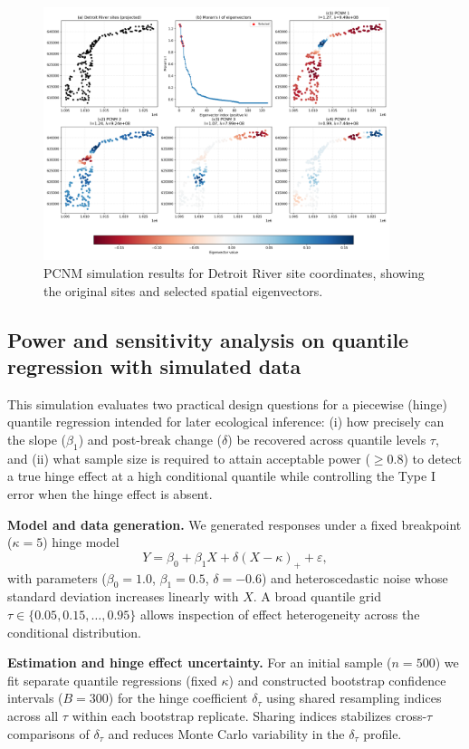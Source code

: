 \begin{figure}[!h]
\centering
\includegraphics[width=0.9\textwidth]{../results/preliminary_results/pcnm_simulation_detroit_river.png}
\caption{PCNM simulation results for Detroit River site coordinates, showing the original sites and selected spatial eigenvectors.}
\label{fig:pcnm_simulation_detroit_river}
\end{figure}

\clearpage
\subsection{Power and sensitivity analysis on quantile regression with simulated data}

This simulation evaluates two practical design questions for a piecewise (hinge) quantile regression intended for later ecological inference: (i) how precisely can the slope ($\beta_1$) and post-break change ($\delta$) be recovered across quantile levels $\tau$, and (ii) what sample size is required to attain acceptable power ($\geq 0.8$) to detect a true hinge effect at a high conditional quantile while controlling the Type I error when the hinge effect is absent.

\textbf{Model and data generation.} We generated responses under a fixed breakpoint ($\kappa = 5$) hinge model
\[ Y = \beta_0 + \beta_1 X + \delta (X-\kappa)_+ + \varepsilon, \]
with parameters ($\beta_0=1.0$, $\beta_1=0.5$, $\delta=-0.6$) and heteroscedastic noise whose standard deviation increases linearly with $X$. A broad quantile grid $\tau \in \{0.05, 0.15, \ldots, 0.95\}$ allows inspection of effect heterogeneity across the conditional distribution.

\textbf{Estimation and hinge effect uncertainty.} For an initial sample ($n=500$) we fit separate quantile regressions (fixed $\kappa$) and constructed bootstrap confidence intervals ($B=300$) for the hinge coefficient $\delta_\tau$ using shared resampling indices across all $\tau$ within each bootstrap replicate. Sharing indices stabilizes cross-$\tau$ comparisons of $\delta_\tau$ and reduces Monte Carlo variability in the $\delta_\tau$ profile.

